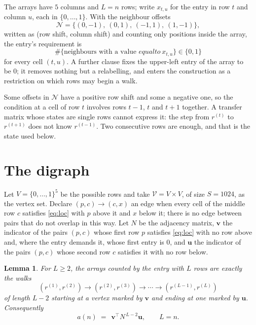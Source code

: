 \documentclass[11pt,a4paper]{article}
\theoremstyle{plain}
\newtheorem{lemma}[theorem]{Lemma}
\theoremstyle{definition}
\begin{document}
The arrays have $5$ columns and $L=n$ rows; write $x_{t,u}$ for the entry in
row $t$ and column $u$, each in $\{0,\dots,1\}$. With the neighbour offsets
\[
\mathcal N=\{(0,-1),\ (0,1),\ (-1,1),\ (1,-1)\},
\]
written as (row shift, column shift) and counting only positions inside the array, the
entry's requirement is
\begin{equation}\label{eq:loc}
\#\{\text{neighbours with a value }equal to\ x_{t,u}\}\in\{0,1\}
\end{equation}
for every cell $(t,u)$. A further clause fixes the upper-left entry of the array to be $0$; it removes nothing but a relabelling, and enters the construction as a restriction on which rows may begin a walk.

Some offsets in $\mathcal N$ have a positive row shift and some a negative one, so the
condition at a cell of row $t$ involves rows $t-1$, $t$ and $t+1$ together. A transfer
matrix whose states are single rows cannot express it: the step from $r^{(t)}$ to
$r^{(t+1)}$ does not know $r^{(t-1)}$. Two consecutive rows are enough, and that is
the state used below.

\section{The digraph}

Let $V=\{0,\dots,1\}^{5}$ be the possible rows and take
$\mathcal V=V\times V$, of size $S=1024$, as the vertex set. Declare $(p,c)\to(c,x)$ an edge
when every cell of the middle row $c$ satisfies \eqref{eq:loc} with $p$ above it and $x$
below it; there is no edge between pairs that do not overlap in this way. Let $N$ be the
adjacency matrix, $\mathbf{v}$ the indicator of the pairs $(p,c)$ whose first row $p$
satisfies \eqref{eq:loc} with no row above and, where the entry demands it, whose first entry is $0$, and $\mathbf{u}$ the indicator of
the pairs $(p,c)$ whose second row $c$ satisfies it with no row below.

\begin{lemma}\label{lem:walk}
For $L\ge2$, the arrays counted by the entry with $L$ rows are exactly the walks
\[
(r^{(1)},r^{(2)})\to(r^{(2)},r^{(3)})\to\cdots\to(r^{(L-1)},r^{(L)})
\]
of length $L-2$ starting at a vertex marked by $\mathbf{v}$ and ending at one marked by
$\mathbf{u}$. Consequently
\[
a(n)\;=\;\,\mathbf{v}^{\!\top}N^{\,L-2}\mathbf{u},\qquad L=n .
\]
\end{lemma}
\end{document}
